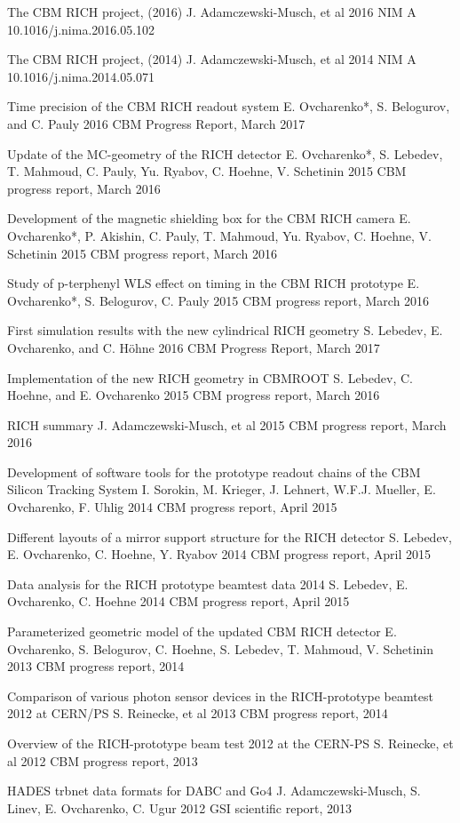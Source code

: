 The CBM RICH project, (2016)
J. Adamczewski-Musch, et al 2016 NIM A
10.1016/j.nima.2016.05.102

The CBM RICH project, (2014)
J. Adamczewski-Musch, et al 2014 NIM A
10.1016/j.nima.2014.05.071


Time precision of the CBM RICH readout system
E. Ovcharenko*, S. Belogurov, and C. Pauly
2016 CBM Progress Report, March 2017

Update of the MC-geometry of the RICH detector
E. Ovcharenko*, S. Lebedev, T. Mahmoud, C. Pauly, Yu. Ryabov, C. Hoehne, V. Schetinin
2015 CBM progress report, March 2016

Development of the magnetic shielding box for the CBM RICH camera
E. Ovcharenko*, P. Akishin, C. Pauly, T. Mahmoud, Yu. Ryabov, C. Hoehne, V. Schetinin
2015 CBM progress report, March 2016

Study of p-terphenyl WLS effect on timing in the CBM RICH prototype
E. Ovcharenko*, S. Belogurov, C. Pauly
2015 CBM progress report, March 2016


First simulation results with the new cylindrical RICH geometry
S. Lebedev, E. Ovcharenko, and C. Höhne
2016 CBM Progress Report, March 2017

Implementation of the new RICH geometry in CBMROOT
S. Lebedev, C. Hoehne, and E. Ovcharenko
2015 CBM progress report, March 2016

RICH summary
J. Adamczewski-Musch, et al
2015 CBM progress report, March 2016

Development of software tools for the prototype readout chains of the CBM Silicon Tracking System
I. Sorokin, M. Krieger, J. Lehnert, W.F.J. Mueller, E. Ovcharenko, F. Uhlig
2014 CBM progress report, April 2015

Different layouts of a mirror support structure for the RICH detector
S. Lebedev, E. Ovcharenko, C. Hoehne, Y. Ryabov
2014 CBM progress report, April 2015

Data analysis for the RICH prototype beamtest data 2014
S. Lebedev, E. Ovcharenko, C. Hoehne
2014 CBM progress report, April 2015

Parameterized geometric model of the updated CBM RICH detector
E. Ovcharenko, S. Belogurov, C. Hoehne, S. Lebedev, T. Mahmoud, V. Schetinin
2013 CBM progress report, 2014

Comparison of various photon sensor devices in the RICH-prototype beamtest 2012 at CERN/PS
S. Reinecke, et al
2013 CBM progress report, 2014

Overview of the RICH-prototype beam test 2012 at the CERN-PS
S. Reinecke, et al
2012 CBM progress report, 2013

HADES trbnet data formats for DABC and Go4
J. Adamczewski-Musch, S. Linev, E. Ovcharenko, C. Ugur
2012 GSI scientific report, 2013
